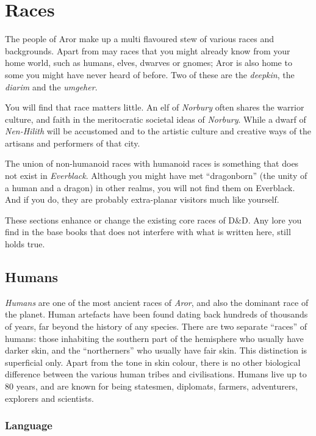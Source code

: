\twocolumn
\section*{Races}

The people of Aror make up a multi flavoured stew of various races and
backgrounds. Apart from may races that you might already know from your
home world, such as humans, elves, dwarves or gnomes; Aror is also home to some
you might have never heard of before. Two of these are the \emph{deepkin}, the
\emph{diarim} and the \emph{umgeher}.

You will find that race matters little. An elf of \emph{Norbury} often shares
the warrior culture, and faith in the meritocratic societal ideas
of \emph{Norbury}. While a dwarf of \emph{Nen-Hilith} will be accustomed and
to the artistic culture and creative ways of the artisans and performers of
that city.

The union of non-humanoid races with humanoid races is something that does
not exist in \emph{Everblack}. Although you might have met ``dragonborn''
(the unity of a human and a dragon) in other realms, you will not find them
on Everblack. And if you do, they are probably extra-planar visitors much
like yourself.

\begin{note}
These sections enhance or change the existing core races of D\&D. Any lore you
find in the base books that does not interfere with what is written here, still
holds true.
\end{note}

\subsection*{Humans}

\emph{Humans} are one of the most ancient races of \emph{Aror}, and also the
dominant race of the planet. Human artefacts have been found dating back
hundreds of thousands of years, far beyond the history of any species. There
are two separate ``races'' of humans: those inhabiting the southern part of
the hemisphere who usually have darker skin, and the ``northerners'' who
usually have fair skin. This distinction is superficial only. Apart from the
tone in skin colour, there is no other biological difference between the
various human tribes and civilisations. Humans live up to 80 years, and are
known for being statesmen, diplomats, farmers, adventurers, explorers and
scientists.

\subsubsection*{Language}

